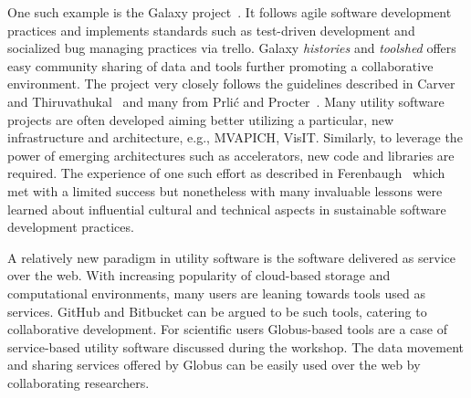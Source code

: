 \documentclass[11pt, oneside]{amsart}
\newcommand{\note}[1]{ {\textcolor{red}    { #1 }}}
\newcommand{\toolname}[1] {\textsf{#1}}
\begin{document}
One such example is the \toolname{Galaxy} project~\cite{Galaxy}. It follows agile software
development practices and implements standards such as test-driven development
and socialized bug managing practices via \toolname{trello}. Galaxy
\emph{histories} and \emph{toolshed} offers easy community sharing of data and
tools further promoting a collaborative environment. The project very closely
follows the guidelines described in Carver and Thiruvathukal~\cite{Carver_WSSSPE} and many
from Prli\'{c} and Procter~\cite{Prlic_WSSSPE}. Many utility software projects are often developed
aiming better utilizing a particular, new infrastructure and architecture,
e.g., \toolname{MVAPICH}, \toolname{VisIT}. Similarly, to leverage the power of
emerging architectures such as accelerators, new code and libraries are
required. The experience of one such effort as described
in Ferenbaugh~\cite{Ferenbaugh_WSSSPE} which met with a limited success but nonetheless
with many invaluable lessons were learned about influential cultural and
technical aspects in sustainable software development practices.

A relatively new paradigm in utility software is the software delivered as
service over the web. With increasing popularity of cloud-based storage and
computational environments, many users are leaning towards tools used as
services. \toolname{GitHub} and \toolname{Bitbucket} can be argued to be
such tools, catering to collaborative development. For scientific users
\toolname{Globus}-based tools are a case of service-based utility software
discussed during the workshop. The data movement and sharing services offered
by Globus can be easily used over the web by collaborating researchers.
%
%
%
%
\end{document}

